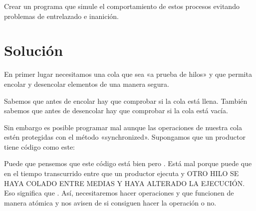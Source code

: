 \documentclass[letterpaper,10pt,spanish]{sphinxmanual}
\begin{document}
Crear un programa que simule el comportamiento de estos procesos evitando problemas de entrelazado e inanición.


\section{Solución}
\label{\detokenize{textos/tema2:solucion}}
En primer lugar necesitamos una cola que sea «a prueba de hilos» y que permita encolar y desencolar elementos de una manera segura.

Sabemos que antes de encolar hay que comprobar si la cola está llena. También sabemos que antes de desencolar hay que comprobar si la cola está vacía.

Sin embargo  es posible programar mal aunque las operaciones de nuestra cola estén protegidas con el método «synchronized». Supongamos que un productor tiene código como este:

\begin{sphinxVerbatim}[commandchars=\\\{\}]
 
         
\end{sphinxVerbatim}

Puede que pensemos que este código está bien pero . Está mal porque puede que en el tiempo transcurrido entre que un productor ejecuta  y  OTRO HILO SE HAYA COLADO ENTRE MEDIAS Y HAYA ALTERADO LA EJECUCIÓN. Eso significa que . Así, necesitaremos hacer operaciones  y  que funcionen de manera atómica y nos avisen de si consiguen hacer la operación o no.
\end{document}
